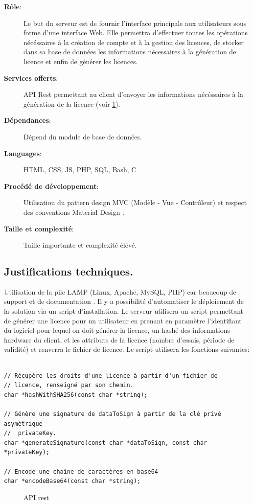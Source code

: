 \begin{description}
	\item[\textbf{Rôle}:]
				Le but du serveur est de fournir l'interface principale aux utilisateurs sous forme d'une interface Web.
                Elle permettra d'effectuer toutes les opérations nécéssaires à la création de compte et à la gestion des
                licences, de stocker dans sa base de données les informations nécessaires à la génération de licence
                et enfin de générer les licences.
	\item[\textbf{Services offerts}:]
				API Rest \cite{REST} permettant au client d'envoyer les informations
				nécéssaires à la génération de la licence (voir \ref{fig:fig2}).
	\item[\textbf{Dépendances}:]
				Dépend du module de base de données.
	\item[\textbf{Languages}:]
				HTML, CSS, JS, PHP, SQL, Bash, C 
	\item[\textbf{Procédé de développement}:]
				Utilisation du pattern design MVC (Modèle - Vue - Contrôleur) et respect des
                conventions Material Design \cite{Material}.
	\item[\textbf{Taille et complexité}:]
				Taille importante et complexité élévé.
\end{description}

\subsection{Justifications techniques.}
Utilisation de la pile LAMP (Linux, Apache, MySQL, PHP) car beaucoup de 
support et de documentation \cite{LAMP}. Il y a possibilité d'automatiser 
le déploiement de la solution via un script d'installation.\newline
Le serveur utilisera un script permettant de générer une licence pour un 
utilisateur en prenant en paramètre l'identifiant du logiciel pour lequel on doit 
générer la licence, un hashé des informations hardware du client, et les
attributs de la licence (nombre d'essais, période de validité) et renverra
le fichier de licence. Le script utilisera les fonctions suivantes:
\begin{verbatim}

// Récupère les droits d'une licence à partir d'un fichier de
// licence, renseigné par son chemin.
char *hashWithSHA256(const char *string);

// Génère une signature de dataToSign à partir de la clé privé asymétrique 
//  privateKey. 
char *generateSignature(const char *dataToSign, const char *privateKey);
  
// Encode une chaîne de caractères en base64
char *encodeBase64(const char *string);

\end{verbatim}
\begin{figure}[hp!]
    \vspace{-0.5cm}
	\caption{API rest}
	
	\label{fig:fig2}
\end{figure}

